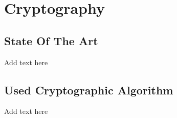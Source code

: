 \documentclass[../main.tex]{subfiles}
\begin{document}
\chapter{Cryptography}

\section{State Of The Art}
Add text here

\section{Used Cryptographic Algorithm}
Add text here
\end{document}
